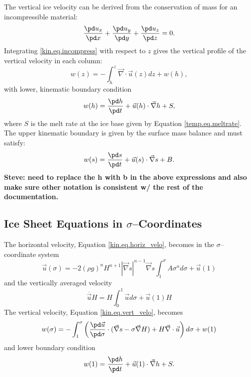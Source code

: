 The vertical ice velocity can be derived from the conservation of mass for an incompressible material:
\begin{equation}
  \label{kin.eq.incompress}
  \frac{\pd u_x}{\pd x} + \frac{\pd u_y}{\pd y} + \frac{\pd u_z}{\pd z} = 0.
\end{equation}
Integrating \eqref{kin.eq.incompress} with respect to $z$ gives the vertical profile of the vertical velocity in each column:
\begin{equation}
  \label{kin.eq.vert_velo}
  w(z)=-\int_h^z\vec\nabla\cdot\vec u(z)dz+w(h),
\end{equation}
with lower, kinematic boundary condition
\begin{equation}
  w(h)=\frac{\pd h}{\pd t}+\vec u(h)\cdot\vec\nabla h+S,
\end{equation}
where $S$ is the melt rate at the ice base given by Equation \eqref{temp.eq.meltrate}. The upper kinematic boundary is given by the surface mass balance and must satisfy:
\begin{equation}
  \label{kin.eq.upper_bc}
  w(s)=\frac{\pd s}{\pd t}+\vec u(s)\cdot\vec\nabla s+B.
\end{equation}
\textbf{Steve: need to replace the h with b in the above expressions and also make sure other notation is consistent w/ the rest of the documentation.}



\subsection{Ice Sheet Equations in $\sigma$--Coordinates}
The horizontal velocity, Equation \eqref{kin.eq.horiz_velo}, becomes in the $\sigma$--coordinate system
\begin{equation}
  \label{kin.eq.vert_velo_sigma}
  \vec u(\sigma) = -2(\rho g)^nH^{n+1}|\vec\nabla s|^{n-1}\vec\nabla s\int_1^\sigma A\sigma^nd\sigma+\vec u(1)
\end{equation}
and the vertically averaged velocity
\begin{equation}
  \label{kin.eq.avg_velo_scaled}
  \overline{\vec u} H=H\int_0^1\vec ud\sigma+\vec u(1)H
\end{equation}
The vertical velocity, Equation \eqref{kin.eq.vert_velo}, becomes
\begin{equation}
  \label{kin.eq.vert_velo_scaled}
  w(\sigma)=-\int_1^\sigma\left(\frac{\pd\vec u}{\pd\sigma}\cdot(\vec\nabla s-\sigma\vec\nabla H)+H\vec\nabla\cdot\vec u\right)d\sigma+w(1)
\end{equation}
and lower boundary condition
\begin{equation}
  w(1)=\frac{\pd h}{\pd t}+\vec u(1)\cdot\vec\nabla h+S.
\end{equation}

